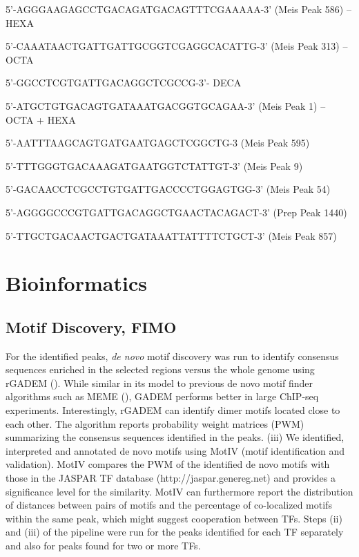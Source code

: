 5’-AGGGAAGAGCCTGACAGATGACAGTTTCGAAAAA-3’ (Meis Peak 586) -- HEXA

5’-CAAATAACTGATTGATTGCGGTCGAGGCACATTG-3’ (Meis Peak 313) – OCTA

5’-GGCCTCGTGATTGACAGGCTCGCCG-3’- DECA

5’-ATGCTGTGACAGTGATAAATGACGGTGCAGAA-3’ (Meis  Peak 1) -- OCTA + HEXA

5’-AATTTAAGCAGTGATGAATGAGCTCGGCTG-3 (Meis Peak 595)

5’-TTTGGGTGACAAAGATGAATGGTCTATTGT-3’ (Meis Peak 9)

5’-GACAACCTCGCCTGTGATTGACCCCTGGAGTGG-3’ (Meis Peak 54)

5’-AGGGGCCCGTGATTGACAGGCTGAACTACAGACT-3’ (Prep Peak 1440)

5’-TTGCTGACAACTGACTGATAAATTATTTTCTGCT-3’ (Meis Peak 857)



\section{Bioinformatics}

\subsection{Motif Discovery, FIMO}

For the identified peaks, \textit{de novo} motif discovery was run to identify consensus sequences enriched in the selected regions versus the whole genome using rGADEM (\cite{Li2009a}). While similar in its model to previous de novo motif finder algorithms such as MEME (\cite{Bailey2006}), GADEM performs better in large ChIP-seq experiments. Interestingly, rGADEM can identify dimer motifs located close to each other. The algorithm reports probability weight matrices (PWM) summarizing the consensus sequences identified in the peaks. (iii) We identified, interpreted and annotated de novo motifs using MotIV (motif identification and validation). MotIV compares the PWM of the identified de novo motifs with those in the JASPAR TF database (http://jaspar.genereg.net) and provides a significance level for the similarity. MotIV can furthermore report the distribution of distances between pairs of motifs and the percentage of co-localized motifs within the same peak, which might suggest cooperation between TFs. Steps (ii) and (iii) of the pipeline were run for the peaks identified for each TF separately and also for peaks found for two or more TFs. 

